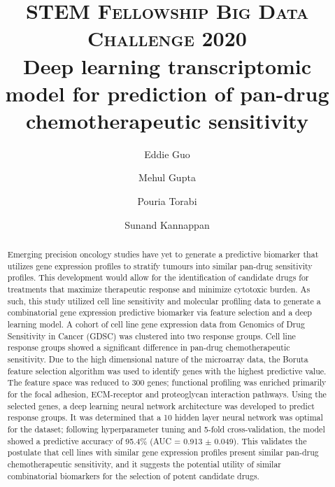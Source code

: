 \documentclass[10pt, letterpaper]{article}
\title{
    \usefont{OT1}{bch}{b}{n}
    \normalfont \normalsize \textsc{STEM Fellowship Big Data Challenge 2020} \\ [10pt]
    \huge Deep learning transcriptomic model for prediction of pan-drug chemotherapeutic sensitivity \\
}
\author[1]{Eddie Guo}
\author[2]{Mehul Gupta}
\author[1]{Pouria Torabi}
\author[2]{Sunand Kannappan}
\affil[1]{University of Alberta}
\affil[2]{University of Calgary}
\begin{document}
\maketitle


\begin{abstract}
	Emerging precision oncology studies have yet to generate a predictive biomarker that utilizes gene expression profiles to stratify tumours into similar pan-drug sensitivity profiles. This development would allow for the identification of candidate drugs for treatments that maximize therapeutic response and minimize cytotoxic burden. As such, this study utilized cell line sensitivity and molecular profiling data to generate a combinatorial gene expression predictive biomarker via feature selection and a deep learning model. A cohort of cell line gene expression data from Genomics of Drug Sensitivity in Cancer (GDSC) was clustered into two response groups. Cell line response groups showed a significant difference in pan-drug chemotherapeutic sensitivity. Due to the high dimensional nature of the microarray data, the Boruta feature selection algorithm was used to identify genes with the highest predictive value. The feature space was reduced to 300 genes; functional profiling was enriched primarily for the focal adhesion, ECM-receptor and proteoglycan interaction pathways. Using the selected genes, a deep learning neural network architecture was developed to predict response groups. It was determined that a 10 hidden layer neural network was optimal for the dataset; following hyperparameter tuning and 5-fold cross-validation, the model showed a predictive accuracy of 95.4\% (AUC = 0.913 $\pm$ 0.049).  This validates the postulate that cell lines with similar gene expression profiles present similar pan-drug chemotherapeutic sensitivity, and it suggests the potential utility of similar combinatorial biomarkers for the selection of potent candidate drugs. \vspace{1em}

\end{abstract} \vspace{1em}
\end{document}
